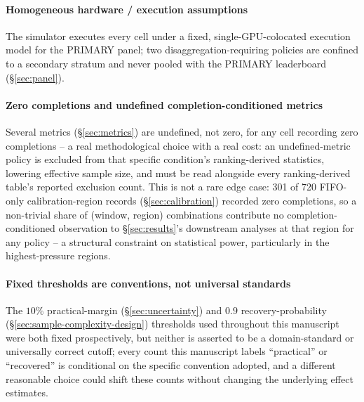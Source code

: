 \paragraph{Homogeneous hardware / execution assumptions} The simulator
executes every cell under a fixed, single-GPU-colocated execution model for
the PRIMARY panel; two disaggregation-requiring policies are confined to a
secondary stratum and never pooled with the PRIMARY leaderboard
(\S\ref{sec:panel}).

\paragraph{Zero completions and undefined completion-conditioned
metrics} Several metrics (\S\ref{sec:metrics}) are undefined, not zero,
for any cell recording zero completions -- a real methodological choice
with a real cost: an undefined-metric policy is excluded from that
specific condition's ranking-derived statistics, lowering effective
sample size, and must be read alongside every ranking-derived table's
reported exclusion count. This is not a rare edge case: 301 of 720
FIFO-only calibration-region records (\S\ref{sec:calibration}) recorded
zero completions, so a non-trivial share of (window, region) combinations
contribute no completion-conditioned observation to \S\ref{sec:results}'s
downstream analyses at that region for any policy -- a structural
constraint on statistical power, particularly in the highest-pressure
regions.

\paragraph{Fixed thresholds are conventions, not universal standards} The
$10\%$ practical-margin (\S\ref{sec:uncertainty}) and $0.9$ recovery-probability
(\S\ref{sec:sample-complexity-design}) thresholds used throughout this
manuscript were both fixed prospectively, but neither is asserted to be a
domain-standard or universally correct cutoff; every count this manuscript
labels ``practical'' or ``recovered'' is conditional on the specific
convention adopted, and a different reasonable choice could shift these
counts without changing the underlying effect estimates.

